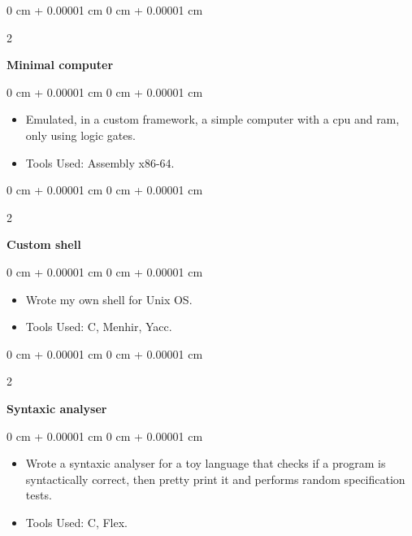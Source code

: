 \documentclass[10pt, letterpaper]{article}
\newenvironment{highlights}{
    \begin{itemize}[
        topsep=0.10 cm,
        parsep=0.10 cm,
        partopsep=0pt,
        itemsep=0pt,
        leftmargin=0 cm + 10pt
    ]
}{
    \end{itemize}
} %
\newenvironment{onecolentry}{
    \begin{adjustwidth}{
        0 cm + 0.00001 cm
    }{
        0 cm + 0.00001 cm
    }
}{
    \end{adjustwidth}
} %
\newenvironment{twocolentry}[2][]{
    \onecolentry
    \def\secondColumn{#2}
    \setcolumnwidth{\fill, 4.5 cm}
    \begin{paracol}{2}
}{
    \switchcolumn \raggedleft \secondColumn
    \end{paracol}
    \endonecolentry
} %
\begin{document}
        \vspace{0.2 cm}
        
        \begin{twocolentry}{
            \href{}{}
        }
            \textbf{Minimal computer}\end{twocolentry}

        \vspace{0.10 cm}
        \begin{onecolentry}
            \begin{highlights}
                \item Emulated, in a custom framework, a simple computer with a cpu and ram, only using logic gates.
                \item Tools Used: Assembly x86-64.
            \end{highlights}
        \end{onecolentry}


        \vspace{0.2 cm}
        
        
        \begin{twocolentry}{
            \href{}{}
        }
            \textbf{Custom shell}\end{twocolentry}

        \vspace{0.10 cm}
        \begin{onecolentry}
            \begin{highlights}
                \item Wrote my own shell for Unix OS.
                \item Tools Used: C, Menhir, Yacc.
            \end{highlights}
        \end{onecolentry}


        \vspace{0.2 cm}
        
        \begin{twocolentry}{
            \href{}{}
        }
            \textbf{Syntaxic analyser}\end{twocolentry}

        \vspace{0.10 cm}
        \begin{onecolentry}
            \begin{highlights}
                \item Wrote a syntaxic analyser for a toy language that checks if a program is syntactically correct, then pretty print it and performs random specification tests.
                \item Tools Used: C, Flex.
            \end{highlights}
        \end{onecolentry}
\end{document}
